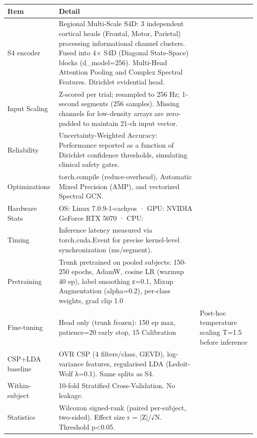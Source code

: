 \begin{tabular}{ll}
\toprule
Item & Detail \\
\midrule
S4 encoder & Regional Multi-Scale S4D: 3 independent cortical heads (Frontal, Motor, Parietal) processing informational channel clusters. Fused into 4× S4D (Diagonal State-Space) blocks (d_model=256). Multi-Head Attention Pooling and Complex Spectral Features. Dirichlet evidential head. \\
Input Scaling & Z-scored per trial; resampled to 256 Hz; 1-second segments (256 samples). Missing channels for low-density arrays are zero-padded to maintain 21-ch input vector. \\
Reliability & Uncertainty-Weighted Accuracy: Performance reported as a function of Dirichlet confidence thresholds, simulating clinical safety gates. \\
Optimizations & torch.compile (reduce-overhead), Automatic Mixed Precision (AMP),  and vectorized Spectral GCN. \\
Hardware Stats & OS: Linux 7.0.9-1-cachyos · GPU: NVIDIA GeForce RTX 5070 · CPU: \\
Timing & Inference latency measured via torch.cuda.Event for precise kernel-level synchronization (ms/segment). \\
Pretraining & Trunk pretrained on pooled subjects: 150-250 epochs, AdamW,  cosine LR (warmup 40 ep), label smoothing ε=0.1, Mixup Augmentation (alpha=0.2),  per-class weights, grad clip 1.0 \\
Fine-tuning & Head only (trunk frozen): 150 ep max, patience=20 early stop,  15%
Calibration & Post-hoc temperature scaling T=1.5 before inference \\
CSP+LDA baseline & OVR CSP (4 filters/class, GEVD), log-variance features,  regularised LDA (Ledoit-Wolf λ=0.1). Same splits as S4. \\
Within-subject & 10-fold Stratified Cross-Validation. No leakage. \\
Statistics & Wilcoxon signed-rank (paired per-subject, two-sided).  Effect size r = |Z|/√N. Threshold p<0.05. \\
\bottomrule
\end{tabular}


